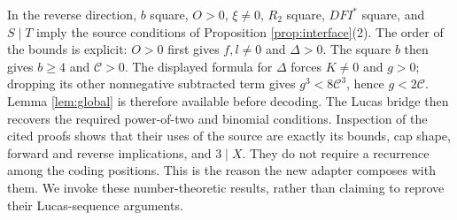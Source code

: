 \documentclass[11pt,a4paper]{article}
\theoremstyle{remark}
\renewcommand{\Cap}{\mathscr C}
\begin{document}
In the reverse direction, \(b\) square, \(O>0\), \(\xi\ne0\),
\(R_2\) square, \(DFI^*\) square, and \(S\mid T\) imply the source
conditions of Proposition \ref{prop:interface}(2).
The order of the bounds is explicit: \(O>0\) first gives
\(f,l\ne0\) and \(\Delta>0\). The square \(b\) then gives
\(b\ge4\) and \(\Cap>0\). The displayed formula for \(\Delta\)
forces \(K\ne0\) and \(g>0\); dropping its other nonnegative
subtracted term gives \(g^3<8\Cap^3\), hence \(g<2\Cap\).
Lemma \ref{lem:global} is therefore available before decoding.
The Lucas bridge then recovers the required power-of-two and
binomial conditions.
Inspection of the cited proofs shows that their uses of the source
are exactly its bounds, cap shape, forward and reverse implications,
and \(3\mid X\). They do not require a recurrence among the coding
positions. This is the reason the new adapter composes with them.
We invoke these number-theoretic results, rather than claiming to
reprove their Lucas-sequence arguments.
\end{document}
